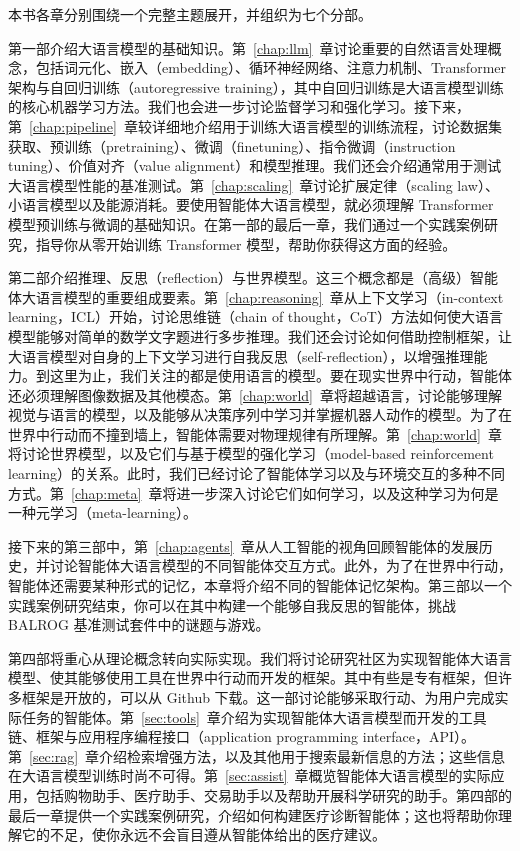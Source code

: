 本书各章分别围绕一个完整主题展开，并组织为七个分部。

第一部介绍大语言模型的基础知识。第~\ref{chap:llm}~章讨论重要的自然语言处理概念，包括词元化、嵌入（embedding）、循环神经网络、注意力机制、Transformer 架构与自回归训练（autoregressive training），其中自回归训练是大语言模型训练的核心机器学习方法。我们也会进一步讨论监督学习和强化学习。接下来，第~\ref{chap:pipeline}~章较详细地介绍用于训练大语言模型的训练流程，讨论数据集获取、预训练（pretraining）、微调（finetuning）、指令微调（instruction tuning）、价值对齐（value alignment）和模型推理。我们还会介绍通常用于测试大语言模型性能的基准测试。第~\ref{chap:scaling}~章讨论扩展定律（scaling law）、小语言模型以及能源消耗。要使用智能体大语言模型，就必须理解 Transformer 模型预训练与微调的基础知识。在第一部的最后一章，我们通过一个实践案例研究，指导你从零开始训练 Transformer 模型，帮助你获得这方面的经验。

第二部介绍推理、反思（reflection）与世界模型。这三个概念都是（高级）智能体大语言模型的重要组成要素。第~\ref{chap:reasoning}~章从上下文学习（in-context learning，ICL）开始，讨论思维链（chain of thought，CoT）方法如何使大语言模型能够对简单的数学文字题进行多步推理。我们还会讨论如何借助控制框架，让大语言模型对自身的上下文学习进行自我反思（self-reflection），以增强推理能力。到这里为止，我们关注的都是使用语言的模型。要在现实世界中行动，智能体还必须理解图像数据及其他模态。第~\ref{chap:world}~章将超越语言，讨论能够理解视觉与语言的模型，以及能够从决策序列中学习并掌握机器人动作的模型。为了在世界中行动而不撞到墙上，智能体需要对物理规律有所理解。第~\ref{chap:world}~章将讨论世界模型，以及它们与基于模型的强化学习（model-based reinforcement learning）的关系。此时，我们已经讨论了智能体学习以及与环境交互的多种不同方式。第~\ref{chap:meta}~章将进一步深入讨论它们如何学习，以及这种学习为何是一种元学习（meta-learning）。

接下来的第三部中，第~\ref{chap:agents}~章从人工智能的视角回顾智能体的发展历史，并讨论智能体大语言模型的不同智能体交互方式。此外，为了在世界中行动，智能体还需要某种形式的记忆，本章将介绍不同的智能体记忆架构。第三部以一个实践案例研究结束，你可以在其中构建一个能够自我反思的智能体，挑战 BALROG 基准测试套件中的谜题与游戏。

第四部将重心从理论概念转向实际实现。我们将讨论研究社区为实现智能体大语言模型、使其能够使用工具在世界中行动而开发的框架。其中有些是专有框架，但许多框架是开放的，可以从 Github 下载。这一部讨论能够采取行动、为用户完成实际任务的智能体。第~\ref{sec:tools}~章介绍为实现智能体大语言模型而开发的工具链、框架与应用程序编程接口（application programming interface，API）。第~\ref{sec:rag}~章介绍检索增强方法，以及其他用于搜索最新信息的方法；这些信息在大语言模型训练时尚不可得。第~\ref{sec:assist}~章概览智能体大语言模型的实际应用，包括购物助手、医疗助手、交易助手以及帮助开展科学研究的助手。第四部的最后一章提供一个实践案例研究，介绍如何构建医疗诊断智能体；这也将帮助你理解它的不足，使你永远不会盲目遵从智能体给出的医疗建议。

